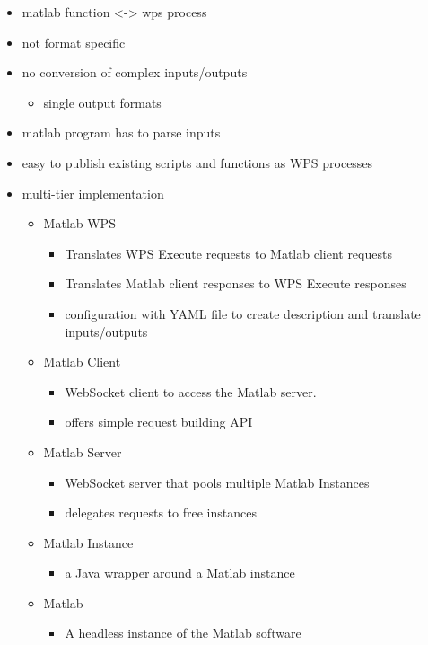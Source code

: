 		\begin{itemize}
			\item matlab function <-> wps process
			\item not format specific
			\item no conversion of complex inputs/outputs
			\begin{itemize}
				\item single output formats
			\end{itemize}
			\item matlab program has to parse inputs
			\item easy to publish existing scripts and functions as WPS processes
			\item multi-tier implementation
			\begin{itemize}
				\item Matlab WPS
				\begin{itemize}
					\item Translates WPS Execute requests to Matlab client requests
					\item Translates Matlab client responses to WPS Execute responses
					\item configuration with YAML file to create description and translate inputs/outputs
				\end{itemize}
				\item Matlab Client
				\begin{itemize}
					\item WebSocket client to access the Matlab server.
					\item offers simple request building API
				\end{itemize}
				\item Matlab Server
				\begin{itemize}
					\item WebSocket server that pools multiple Matlab Instances
					\item delegates requests to free instances
				\end{itemize}
				\item Matlab Instance
				\begin{itemize}
					\item a Java wrapper around a Matlab instance
				\end{itemize}
				\item Matlab
				\begin{itemize}
					\item A headless instance of the Matlab software
				\end{itemize}
			\end{itemize}
		\end{itemize}

